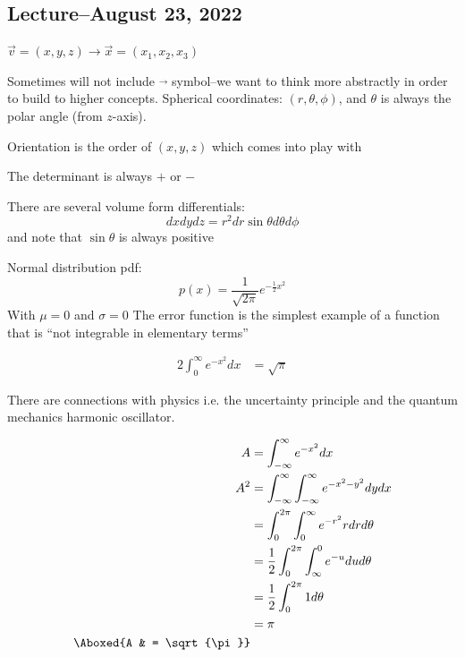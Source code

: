 \documentclass{scrreprt}
\begin{document}
\subsection{Lecture--August 23, 2022}

\begin{definition}

	$\vec{v}=(x,y,z)\rightarrow \vec{x}=(x_1,x_2,x_3)$

	Sometimes will not include $\vec{}$ symbol--we want to think more abstractly in order to build to higher concepts.
	Spherical coordinates: $(r,\theta,\phi)$, and $\theta$ is always the polar angle (from $z$-axis).

	Orientation is the order of $(x, y, z)$ which comes into play with 

\end{definition}

\begin{remark}
	The determinant is always $+$ or $-$
\end{remark}

There are several volume form differentials:
\[
	dxdydz = r^2dr\sin \theta d\theta d\phi
\]
and note that $\sin \theta$ is always positive

\begin{remark}
	Normal distribution pdf: \[p(x)=\frac{1}{\sqrt{2\pi}}e^{-\frac{1}{2}x^2}\]
	With $\mu=0$ and $\sigma=0$
	The error function is the simplest example of a function that is ``not integrable in elementary terms''

	\begin{align*}
		2 \int_0^\infty e^{-x^2}dx & = \sqrt{\pi}
	\end{align*}

	There are connections with physics i.e. the uncertainty principle and the quantum mechanics harmonic oscillator.

	\begin{align*}
		A         & = \int_{-\infty}^{\infty} e^{-x^2}dx                                  \\
		A^2       & = \int_{-\infty}^{\infty} \int_{-\infty}^{\infty} e^{-x^2 - y^2} dydx \\
		          & = \int_{0}^{2\pi}\int_{0}^{\infty} e^{-r^2}rdrd\theta                 \\
		          & = \frac{1}{2}\int_{0}^{2\pi} \int_{\infty}^{0} e^{-u}dud\theta        \\
		          & = \frac{1}{2}\int_{0}^{2\pi} 1 d\theta                                \\
		          & = \pi                                                                 \\
		\Aboxed{A & = \sqrt{\pi}}
	\end{align*}
\end{remark}
\end{document}
